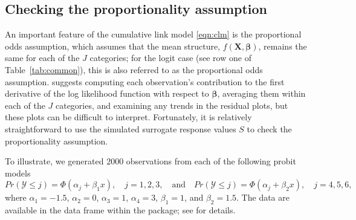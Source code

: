\subsection{Checking the proportionality assumption}

An important feature of the cumulative link model \eqref{eqn:clm} is the proportional odds assumption, which assumes that the mean structure, $f\left(\boldsymbol{X}, \boldsymbol{\beta}\right)$, remains the same for each of the $J$ categories; for the logit case (see row one of Table~\ref{tab:common}), this is also referred to as the proportional odds assumption. \citet[pp. 334--335]{regression-harrell-2001} suggests computing each observation's contribution to the first derivative of the log likelihood function with respect to $\boldsymbol{\beta}$, averaging them within each of the $J$ categories, and examining any trends in the residual plots, but these plots can be difficult to interpret. Fortunately, it is relatively straightforward to use the simulated surrogate response values $S$ to check the proportionality assumption.

To illustrate, we generated 2000 observations from each of the following probit models
\begin{equation*}
  Pr\left(\mathcal{Y} \le j\right) = \Phi\left(\alpha_j + \beta_1 x\right), \quad j = 1, 2, 3, \quad \textrm{and} \quad Pr\left(\mathcal{Y} \le j\right) = \Phi\left(\alpha_j + \beta_2 x\right), \quad j = 4, 5, 6,
\end{equation*}
where $\alpha_1 = -1.5$, $\alpha_2 = 0$, $\alpha_3 = 1$, $\alpha_4 = 3$, $\beta_1 = 1$, and $\beta_2 = 1.5$. The data are available in the data frame  within the package; see  for details. 

